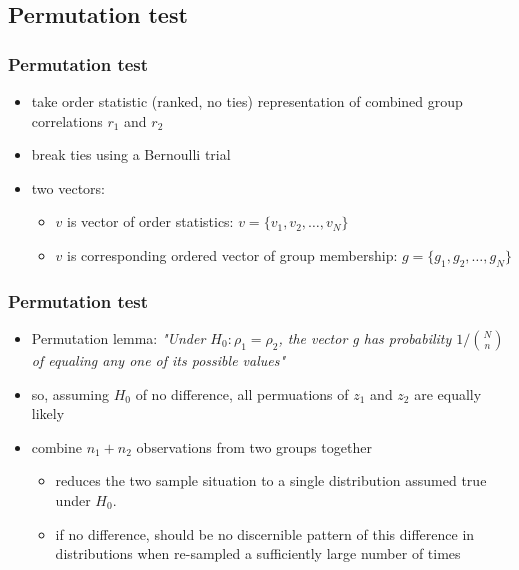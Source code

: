 \documentclass{beamer}
\begin{document}
 
  
  \subsection{Permutation test}
  \begin{frame}
    \frametitle{Permutation test }  
    \begin{itemize}
		  \item take order statistic (ranked, no ties) representation of combined group correlations \(r_1\) and \(r_2\) 
	  	\item break ties using a Bernoulli trial
	  	\item two vectors:
      \begin{itemize}
				\item \(v\) is vector of order statistics: \(v = \{v_1, v_2,\ldots, v_N\}\)
			  \item \(v\) is corresponding ordered vector of group membership: \(g = \{g_1, g_2,\ldots, g_N\}\)
      \end{itemize}
    \end{itemize}
  \end{frame} 
  
  \begin{frame}
    \frametitle{Permutation test }  
    \begin{itemize}
	  	\item Permutation lemma: \it{"Under \(H_0: \rho_1 = \rho_2\), the vector g has probability \(1/\binom{N}{n}\) of equaling any one of its possible values"}
      \item so, assuming \(H_0\) of no difference, all permuations of \(z_1\) and \(z_2\) are equally likely
  		\item combine \(n_1 + n_2\) observations from two groups together
      \begin{itemize}
        \item reduces the two sample situation to a single distribution assumed true under \(H_0\).
	    	\item if no difference, should be no discernible pattern of this difference in distributions when re-sampled a sufficiently large number of times
      \end{itemize}
    \end{itemize}
  \end{frame} 
      
\end{document}
